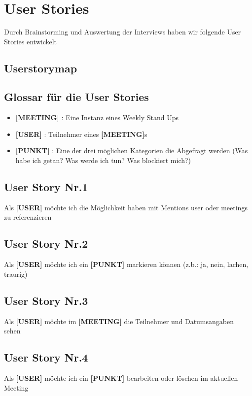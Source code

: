 \chapter{User Stories}

Durch Brainstorming und Auswertung der Interviews haben wir folgende User Stories entwickelt

\section{Userstorymap}

\section{Glossar für die User Stories}
\begin{itemize}
\item \textbf{[MEETING]} : Eine Instanz eines Weekly Stand Ups
\item \textbf{[USER]} : Teilnehmer eines \textbf{[MEETING]}s 
\item \textbf{[PUNKT]} : Eine der drei möglichen Kategorien die Abgefragt werden (Was habe ich getan? Was werde ich tun? Was blockiert mich?)
\end{itemize}
\section{User Story Nr.1} 


Als \textbf{[USER]} möchte ich die Möglichkeit haben mit Mentions user oder meetings zu referenzieren

\section{User Story Nr.2}


Als \textbf{[USER]} möchte ich ein \textbf{[PUNKT]} markieren können (z.b.: ja, nein, lachen, traurig)
\section{User Story Nr.3}


Als \textbf{[USER]} möchte im \textbf{[MEETING]} die Teilnehmer und Datumsangaben sehen
\section{User Story Nr.4 }


Als \textbf{[USER]} möchte ich ein \textbf{[PUNKT]} bearbeiten oder löschen im aktuellen Meeting
